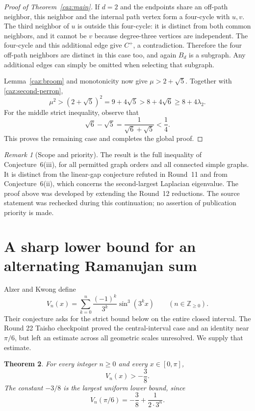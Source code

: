 \documentclass[11pt,a4paper]{article}
\numberwithin{equation}{section}
\newtheorem{theorem}{Theorem}[section]
\theoremstyle{remark}
\newtheorem{remark}[theorem]{Remark}
\begin{document}
\begin{proof}[Proof of Theorem~\ref{caz:main}]
If $d=2$ and the endpoints share an off-path neighbor, this
neighbor and the internal path vertex form a four-cycle with
$u,v$. The third neighbor of $u$ is outside this four-cycle:
it is distinct from both common neighbors, and it cannot be $v$
because degree-three vertices are independent. The four-cycle
and this additional edge give $C^+$, a contradiction. Therefore
the four off-path neighbors are distinct in this case too, and
again $B_d$ is a subgraph. Any additional edges can simply be
omitted when selecting that subgraph.

Lemma~\ref{caz:broom} and monotonicity now give
$\mu>2+\sqrt5$. Together with \eqref{caz:second-perron},
\[
 \mu^2>(2+\sqrt5)^2
 =9+4\sqrt5
 >8+4\sqrt6
 \ge8+4\lambda_2.
\]
For the middle strict inequality, observe that
\[
 \sqrt6-\sqrt5=\frac1{\sqrt6+\sqrt5}<\frac14.
\]
This proves the remaining case and completes the global proof.
\end{proof}

\begin{remark}[Scope and priority]
\label{caz:scope}
The result is the full inequality of Conjecture~6(iii), for all
permitted graph orders and all connected simple graphs. It is
distinct from the linear-gap conjecture refuted in Round~11 and
from Conjecture~6(ii), which concerns the second-largest Laplacian
eigenvalue. The proof above was developed by extending the
Round~12 reductions. The source statement was rechecked during
this continuation; no assertion of publication priority is made.
\end{remark}

\section{A sharp lower bound for an alternating Ramanujan sum}
\label{sec:ramanujan}

Alzer and Kwong \cite[Section 4, conjecture (27)]{AlzerKwong} define
\begin{equation}\label{eq:Vdef}
 V_n(x)=\sum_{k=0}^{n}\frac{(-1)^k}{3^k}\sin^3(3^k x)
 \qquad(n\in\mathbb Z_{\ge0}).
\end{equation}
Their conjecture asks for the strict bound below on the entire closed
interval. The Round 22 Taisho checkpoint proved the central-interval
case and an identity near $\pi/6$, but left an estimate across all
geometric scales unresolved. We supply that estimate.

\begin{theorem}\label{thm:ramanujan}
For every integer $n\ge0$ and every $x\in[0,\pi]$,
\begin{equation}\label{eq:ramanujan-main}
 V_n(x)>-\frac38.
\end{equation}
The constant $-3/8$ is the largest uniform lower bound, since
\begin{equation}\label{eq:sharpness}
 V_n(\pi/6)=-\frac38+\frac{1}{2\cdot3^n}.
\end{equation}
\end{theorem}
\end{document}
